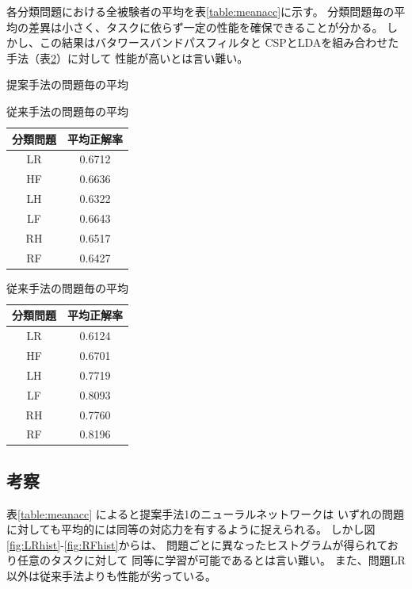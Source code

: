 各分類問題における全被験者の平均を表\ref{table:meanacc}に示す。
分類問題毎の平均の差異は小さく、タスクに依らず一定の性能を確保できることが分かる。
しかし、この結果はバタワースバンドパスフィルタと
CSPとLDAを組み合わせた手法\cite{benth}（表\ref{table:meanacc_csp}）に対して
性能が高いとは言い難い。
\begin{table}[t]
    \begin{minipage}{0.5\hsize}
        \centering
        \caption{提案手法の問題毎の平均}
        \begin{tabular}{|c|c|} \hline
            分類問題 & 平均正解率 \\ \hline
            LR & 0.6712 \\ \hline
            HF & 0.6636 \\ \hline
            LH & 0.6322 \\ \hline
            LF & 0.6643 \\ \hline
            RH & 0.6517 \\ \hline
            RF & 0.6427 \\ \hline
        \end{tabular}
        \label{table:meanacc}
    \end{minipage}
    \begin{minipage}{0.5\hsize}
        \centering
        \caption{従来手法の問題毎の平均\cite{benth}}
        \begin{tabular}{|c|c|} \hline
            分類問題 & 平均正解率 \\ \hline
            LR & 0.6124 \\ \hline
            HF & 0.6701 \\ \hline
            LH & 0.7719 \\ \hline
            LF & 0.8093 \\ \hline
            RH & 0.7760 \\ \hline
            RF & 0.8196 \\ \hline
        \end{tabular}
        \label{table:meanacc_csp}
    \end{minipage}
\end{table}

\subsection{\mc 考察}
表\ref{table:meanacc} によると提案手法1のニューラルネットワークは
いずれの問題に対しても平均的には同等の対応力を有するように捉えられる。
しかし図\ref{fig:LRhist}-\ref{fig:RFhist}からは、
問題ごとに異なったヒストグラムが得られており任意のタスクに対して
同等に学習が可能であるとは言い難い。
また、問題LR以外は従来手法よりも性能が劣っている。

